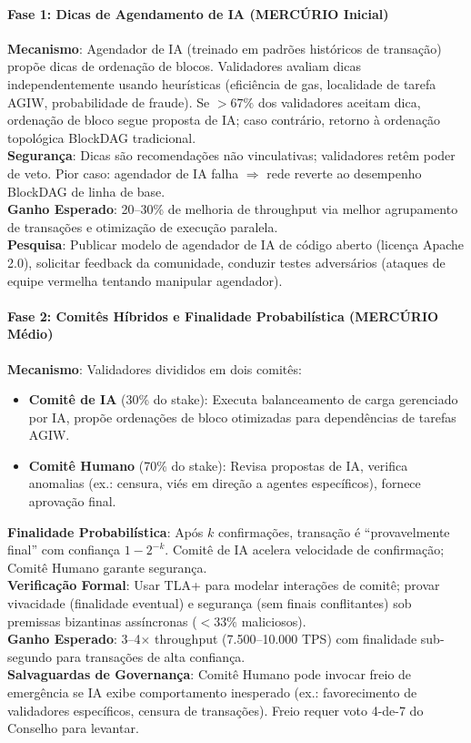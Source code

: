 \documentclass[11pt]{article}
\begin{document}
\paragraph{Fase 1: Dicas de Agendamento de IA (MERCÚRIO Inicial)}
\textbf{Mecanismo}: Agendador de IA (treinado em padrões históricos de transação) propõe dicas de ordenação de blocos. Validadores avaliam dicas independentemente usando heurísticas (eficiência de gas, localidade de tarefa AGIW, probabilidade de fraude). Se $>67\%$ dos validadores aceitam dica, ordenação de bloco segue proposta de IA; caso contrário, retorno à ordenação topológica BlockDAG tradicional.\\
\textbf{Segurança}: Dicas são recomendações não vinculativas; validadores retêm poder de veto. Pior caso: agendador de IA falha $\Rightarrow$ rede reverte ao desempenho BlockDAG de linha de base.\\
\textbf{Ganho Esperado}: 20--30\% de melhoria de throughput via melhor agrupamento de transações e otimização de execução paralela.\\
\textbf{Pesquisa}: Publicar modelo de agendador de IA de código aberto (licença Apache 2.0), solicitar feedback da comunidade, conduzir testes adversários (ataques de equipe vermelha tentando manipular agendador).

\paragraph{Fase 2: Comitês Híbridos e Finalidade Probabilística (MERCÚRIO Médio)}
\textbf{Mecanismo}: Validadores divididos em dois comitês:
\begin{itemize}[noitemsep]
  \item \textbf{Comitê de IA} (30\% do stake): Executa balanceamento de carga gerenciado por IA, propõe ordenações de bloco otimizadas para dependências de tarefas AGIW.
  \item \textbf{Comitê Humano} (70\% do stake): Revisa propostas de IA, verifica anomalias (ex.: censura, viés em direção a agentes específicos), fornece aprovação final.
\end{itemize}
\textbf{Finalidade Probabilística}: Após $k$ confirmações, transação é ``provavelmente final'' com confiança $1 - 2^{-k}$. Comitê de IA acelera velocidade de confirmação; Comitê Humano garante segurança.\\
\textbf{Verificação Formal}: Usar TLA+ para modelar interações de comitê; provar vivacidade (finalidade eventual) e segurança (sem finais conflitantes) sob premissas bizantinas assíncronas ($<33\%$ maliciosos).\\
\textbf{Ganho Esperado}: 3--4$\times$ throughput (7.500--10.000 TPS) com finalidade sub-segundo para transações de alta confiança.\\
\textbf{Salvaguardas de Governança}: Comitê Humano pode invocar freio de emergência se IA exibe comportamento inesperado (ex.: favorecimento de validadores específicos, censura de transações). Freio requer voto 4-de-7 do Conselho para levantar.
\end{document}
